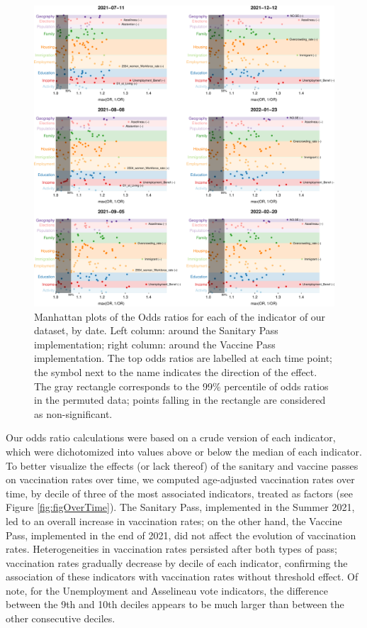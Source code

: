 \documentclass[
]{article}
\begin{document}
\begin{figure}
\centering
\includegraphics{ms_files/figure-latex/figManhattan-1.pdf}
\caption{\label{fig:figManhattan}Manhattan plots of the Odds ratios for each of the indicator of our dataset, by date. Left column: around the Sanitary Pass implementation; right column: around the Vaccine Pass implementation. The top odds ratios are labelled at each time point; the symbol next to the name indicates the direction of the effect. The gray rectangle corresponds to the 99\% percentile of odds ratios in the permuted data; points falling in the rectangle are considered as non-significant.}
\end{figure}

Our odds ratio calculations were based on a crude version of each indicator, which were dichotomized into values above or below the median of each indicator. To better visualize the effects (or lack thereof) of the sanitary and vaccine passes on vaccination rates over time, we computed age-adjusted vaccination rates over time, by decile of three of the most associated indicators, treated as factors (see Figure \ref{fig:figOverTime}). The Sanitary Pass, implemented in the Summer 2021, led to an overall increase in vaccination rates; on the other hand, the Vaccine Pass, implemented in the end of 2021, did not affect the evolution of vaccination rates. Heterogeneities in vaccination rates persisted after both types of pass; vaccination rates gradually decrease by decile of each indicator, confirming the association of these indicators with vaccination rates without threshold effect. Of note, for the Unemployment and Asselineau vote indicators, the difference between the 9th and 10th deciles appears to be much larger than between the other consecutive deciles.
\end{document}
